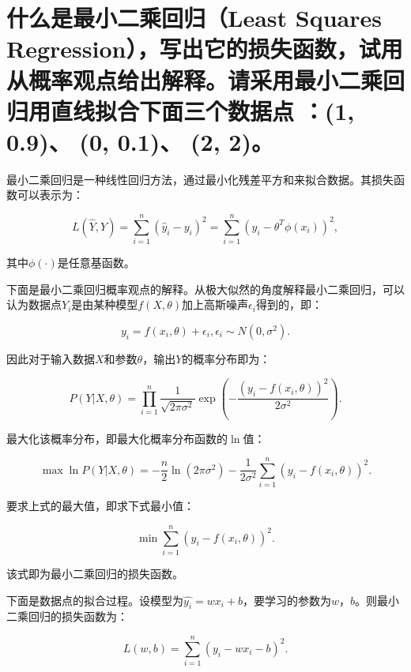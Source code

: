 \documentclass{article}
\begin{document}
\section{什么是最小二乘回归（Least Squares Regression），写出它的损失函数，试用从概率观点给出解释。请采用最小二乘回归用直线拟合下面三个数据点 ：(1, 0.9)、 (0, 0.1)、 (2, 2)。}

最小二乘回归是一种线性回归方法，通过最小化残差平方和来拟合数据。其损失函数可以表示为：

\begin{equation}
    L(\hat{Y},Y)=\sum_{i=1}^{n}(\hat{y}_i-y_i)^2=\sum_{i=1}^{n}(y_i-\theta^T\phi(x_i))^2,
\end{equation}

其中$\phi(\cdot)$是任意基函数。

下面是最小二乘回归概率观点的解释。从极大似然的角度解释最小二乘回归，可以认为数据点$Y_i$是由某种模型$f(X,\theta)$加上高斯噪声$\epsilon_i$得到的，即：

\begin{equation}
    y_i=f(x_i,\theta)+\epsilon_i, \epsilon_i\sim N(0,\sigma^2).
\end{equation}

因此对于输入数据$X$和参数$\theta$，输出$Y$的概率分布即为：

\begin{equation}
    P(Y|X,\theta)=\prod_{i=1}^{n}\frac{1}{\sqrt{2\pi\sigma^2}}\exp\left(-\frac{(y_i-f(x_i,\theta))^2}{2\sigma^2}\right).    
\end{equation}

最大化该概率分布，即最大化概率分布函数的$\ln$值：

\begin{equation}
    \max\ln P(Y|X,\theta)=-\frac{n}{2}\ln(2\pi\sigma^2)-\frac{1}{2\sigma^2}\sum_{i=1}^{n}(y_i-f(x_i,\theta))^2.
\end{equation}

要求上式的最大值，即求下式最小值：

\begin{equation}
    \min\sum_{i=1}^{n}(y_i-f(x_i,\theta))^2.
\end{equation}

该式即为最小二乘回归的损失函数。

下面是数据点的拟合过程。设模型为$\hat{y_i}=wx_i+b$，要学习的参数为$w$，$b$。则最小二乘回归的损失函数为：

\begin{equation}
    L(w,b)=\sum_{i=1}^{n}(y_i-wx_i-b)^2.
\end{equation}
\end{document}
